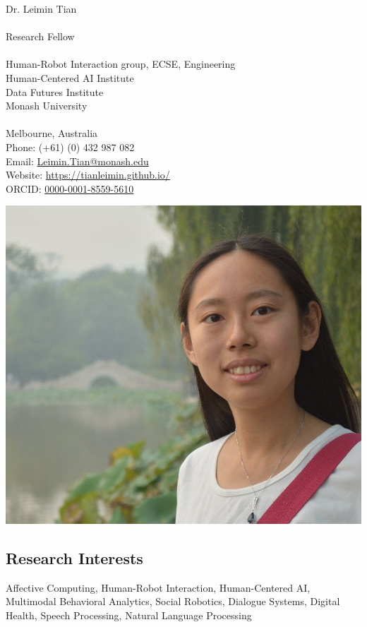 \documentclass[11pt,letterpaper]{article}
\begin{document}
\begin{minipage}[b]{0.55\textwidth}
  {\huge Dr. Leimin Tian \\}
  \\
  {\large Research Fellow \\}
  \\
  Human-Robot Interaction group, ECSE, Engineering \\
  Human-Centered AI Institute \\
  Data Futures Institute \\
  Monash University \\
  \\
  Melbourne, Australia \\
  Phone: (+61) (0) 432 987 082 \\
  Email: \href{mailto:Leimin.Tian@monash.edu}{Leimin.Tian@monash.edu} \\
  Website: \href{https://tianleimin.github.io/}{\ul{https://tianleimin.github.io/}}\\
  ORCID: \href{https://orcid.org/0000-0001-8559-5610}{0000-0001-8559-5610}
\end{minipage}
\hfill
\begin{minipage}[b]{0.4\textwidth}
  \includegraphics[width=\textwidth]{LeiminTian}
\end{minipage}

\bigskip

\subsection*{Research Interests}
Affective Computing, Human-Robot Interaction, Human-Centered AI, Multimodal Behavioral Analytics, Social Robotics, Dialogue Systems, Digital Health, Speech Processing, Natural Language Processing
\end{document}
